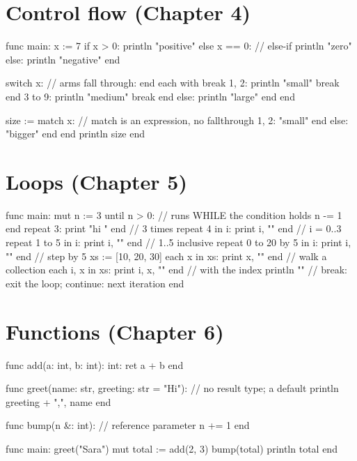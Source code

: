 \section*{Control flow (Chapter 4)}

\begin{salamen}
func main:
    x := 7
    if x > 0:
        println "positive"
    else x == 0:                     // else-if
        println "zero"
    else:
        println "negative"
    end

    switch x:                        // arms fall through: end each with break
        1, 2: println "small" break end
        3 to 9: println "medium" break end
        else: println "large" end
    end

    size := match x:                 // match is an expression, no fallthrough
        1, 2: "small" end
        else: "bigger" end
    end
    println size
end
\end{salamen}

\section*{Loops (Chapter 5)}

\begin{salamen}
func main:
    mut n := 3
    until n > 0:                     // runs WHILE the condition holds
        n -= 1
    end
    repeat 3: print "hi " end        // 3 times
    repeat 4 in i: print i, "" end   // i = 0..3
    repeat 1 to 5 in i: print i, "" end        // 1..5 inclusive
    repeat 0 to 20 by 5 in i: print i, "" end  // step by 5
    xs := [10, 20, 30]
    each x in xs: print x, "" end              // walk a collection
    each i, x in xs: print i, x, "" end        // with the index
    println ""
    // break: exit the loop;  continue: next iteration
end
\end{salamen}

\section*{Functions (Chapter 6)}

\begin{salamen}
func add(a: int, b: int): int:
    ret a + b
end

func greet(name: str, greeting: str = "Hi"):   // no result type; a default
    println greeting + ",", name
end

func bump(n &: int):                 // reference parameter
    n += 1
end

func main:
    greet("Sara")
    mut total := add(2, 3)
    bump(total)
    println total
end
\end{salamen}


